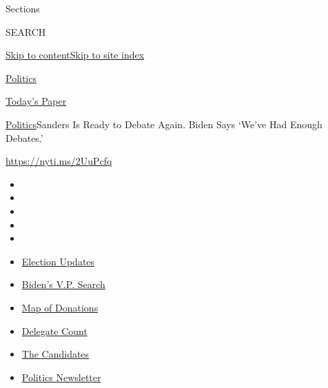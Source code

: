 Sections

SEARCH

\protect\hyperlink{site-content}{Skip to
content}\protect\hyperlink{site-index}{Skip to site index}

\href{https://www.nytimes.com/section/politics}{Politics}

\href{https://myaccount.nytimes.com/auth/login?response_type=cookie\&client_id=vi}{}

\href{https://www.nytimes.com/section/todayspaper}{Today's Paper}

\href{/section/politics}{Politics}\textbar{}Sanders Is Ready to Debate
Again. Biden Says `We've Had Enough Debates.'

\url{https://nyti.ms/2UuPcfq}

\begin{itemize}
\item
\item
\item
\item
\item
\end{itemize}

\begin{itemize}
\item
  \href{https://www.nytimes.com/2020/07/31/us/elections/biden-vs-trump.html?action=click\&pgtype=Article\&state=default\&region=TOP_BANNER\&context=storylines_menu}{Election
  Updates}
\item
  \href{https://www.nytimes.com/article/biden-vice-president-2020.html?action=click\&pgtype=Article\&state=default\&region=TOP_BANNER\&context=storylines_menu}{Biden's
  V.P. Search}
\item
  \href{https://www.nytimes.com/interactive/2020/07/24/us/politics/trump-biden-campaign-donors.html?action=click\&pgtype=Article\&state=default\&region=TOP_BANNER\&context=storylines_menu}{Map
  of Donations}
\item
  \href{https://www.nytimes.com/interactive/2020/us/elections/delegate-count-primary-results.html?action=click\&pgtype=Article\&state=default\&region=TOP_BANNER\&context=storylines_menu}{Delegate
  Count}
\item
  \href{https://www.nytimes.com/interactive/2019/us/politics/2020-presidential-candidates.html?action=click\&pgtype=Article\&state=default\&region=TOP_BANNER\&context=storylines_menu}{The
  Candidates}
\item
  \href{https://www.nytimes.com/newsletters/politics?action=click\&pgtype=Article\&state=default\&region=TOP_BANNER\&context=storylines_menu}{Politics
  Newsletter}
\end{itemize}

